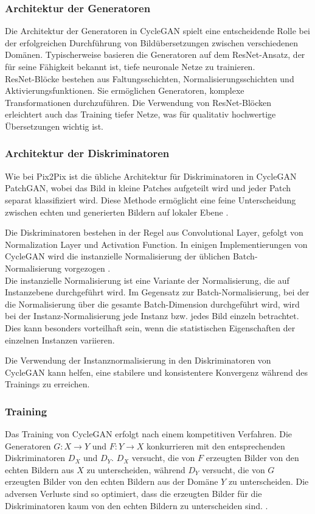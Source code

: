 \subsubsection{Architektur der Generatoren}
Die Architektur der Generatoren in CycleGAN spielt eine entscheidende Rolle bei der erfolgreichen Durchführung von Bildübersetzungen zwischen verschiedenen Domänen. Typischerweise basieren die Generatoren auf dem ResNet-Ansatz, der für seine Fähigkeit bekannt ist, tiefe neuronale Netze zu trainieren.
\\
ResNet-Blöcke bestehen aus Faltungsschichten, Normalisierungsschichten und Aktivierungsfunktionen. Sie ermöglichen Generatoren, komplexe Transformationen durchzuführen. Die Verwendung von ResNet-Blöcken erleichtert auch das Training tiefer Netze, was für qualitativ hochwertige Übersetzungen wichtig ist.

\subsubsection{Architektur der Diskriminatoren}
Wie bei Pix2Pix ist die übliche Architektur für Diskriminatoren in CycleGAN PatchGAN, wobei das Bild in kleine Patches aufgeteilt wird und jeder Patch separat klassifiziert wird. Diese Methode ermöglicht eine feine Unterscheidung zwischen echten und generierten Bildern auf lokaler Ebene \cite{Zhu.2017}.

Die Diskriminatoren bestehen in der Regel aus Convolutional Layer, gefolgt von Normalization Layer und Activation Function. In einigen Implementierungen von CycleGAN wird die instanzielle Normalisierung der üblichen Batch-Normalisierung vorgezogen \cite{}.
\\
Die instanzielle Normalisierung ist eine Variante der Normalisierung, die auf Instanzebene durchgeführt wird. Im Gegensatz zur Batch-Normalisierung, bei der die Normalisierung über die gesamte Batch-Dimension durchgeführt wird, wird bei der Instanz-Normalisierung jede Instanz bzw. jedes Bild einzeln betrachtet. Dies kann besonders vorteilhaft sein, wenn die statistischen Eigenschaften der einzelnen Instanzen variieren.

Die Verwendung der Instanznormalisierung in den Diskriminatoren von CycleGAN kann helfen, eine stabilere und konsistentere Konvergenz während des Trainings zu erreichen.

\subsubsection{Training}
Das Training von CycleGAN erfolgt nach einem kompetitiven Verfahren. Die Generatoren $G:X\rightarrow Y$ und $F:Y\rightarrow X$ konkurrieren mit den entsprechenden Diskriminatoren $D_X$ und $D_Y$. $D_X$ versucht, die von $F$ erzeugten Bilder von den echten Bildern aus $X$ zu unterscheiden, während $D_Y$ versucht, die von $G$ erzeugten Bilder von den echten Bildern aus der Domäne $Y$ zu unterscheiden. Die adversen Verluste sind so optimiert, dass die erzeugten Bilder für die Diskriminatoren kaum von den echten Bildern zu unterscheiden sind. \cite{Zhu.2017}.

